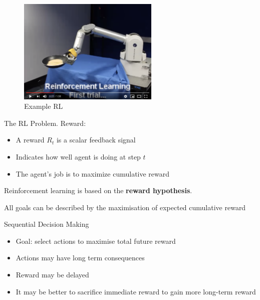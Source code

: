 \documentclass[english]{article}
\begin{document}
    \begin{figure}
        \centering
        \includegraphics[width=0.6\textwidth]{thumbnail.png}
        \caption{Example RL}
        \label{Example RL}
    \end{figure}

\item {The RL Problem}. 
 {Reward}: 
\begin{itemize}
    \item A reward $R_t$ is a scalar feedback signal
    \item Indicates how well agent is doing at step $t$
    \item The agent's job is to maximize cumulative reward
\end{itemize}
Reinforcement learning is based on the \textbf{reward hypothesis}.
 

\begin{definition}
All goals can be described by the maximisation of expected
cumulative reward
\end{definition}



\item 
 {Sequential Decision Making}
\begin{itemize}
    \item Goal: select actions to maximise total future reward
    \item Actions may have long term consequences
    \item Reward may be delayed
    \item It may be better to sacrifice immediate reward to gain more
long-term reward
\end{itemize}
 


\end{document}
